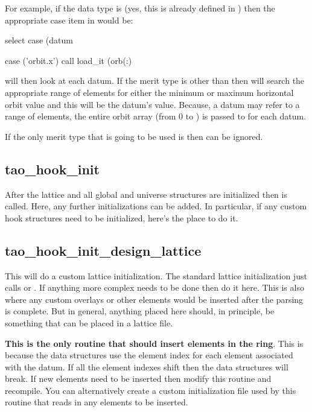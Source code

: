 For example, if the data type is  (yes, this is already
defined in \tao) then the appropriate case item in
 would be:
\begin{example}
select case (datum%

case ('orbit.x')
  call load_it (orb(:)%
\end{example}
 will then look at each datum. If the merit type is other
than  then  will search the appropriate range
of elements for either the minimum or maximum horizontal orbit value
and this will be the datum's value. Because, a datum may refer to a
range of elements, the entire orbit array (from 0 to )
is passed to  for each  datum.

If the only merit type that is going to be used is  then
 can be ignored.

\subsection{tao\_hook\_init}

After the lattice and all global and universe structures are
initialized then  is called. Here, any further
initializations can be added. In particular, if any custom hook
structures need to be initialized, here's the place to do it.

\subsection{tao\_hook\_init\_design\_lattice}

This will do a custom lattice initialization. The standard lattice
initialization just calls  or . If
anything more complex needs to be done then do it here. This is also
where any custom overlays or other elements would be inserted after
the parsing is complete. But in general, anything placed here should,
in principle, be something that can be placed in a lattice file.

\textbf{This is the only routine that should insert elements in the
ring}. This is because the \tao data structures use the element index
for each element associated with the datum. If all the element indexes
shift then the data structures will break. If new elements need to be
inserted then modify this routine and recompile. You can alternatively
create a custom initialization file used by this routine that reads in
any elements to be inserted.

